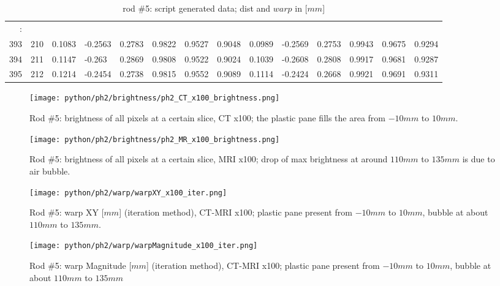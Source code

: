 \begin{table}[p]
{\begin{minipage}{\textheight}
\begin{tabular}{rr||lll|lll||lll|lll}
\hline
:      &      &         &         &        &        &        &        &         &         &        &        &        &        \\
393    & 210  & 0.1083  & -0.2563 & 0.2783 & 0.9822 & 0.9527 & 0.9048 & 0.0989  & -0.2569 & 0.2753 & 0.9943 & 0.9675 & 0.9294 \\
394    & 211  & 0.1147  & -0.263  & 0.2869 & 0.9808 & 0.9522 & 0.9024 & 0.1039  & -0.2608 & 0.2808 & 0.9917 & 0.9681 & 0.9287 \\
395    & 212  & 0.1214  & -0.2454 & 0.2738 & 0.9815 & 0.9552 & 0.9089 & 0.1114  & -0.2424 & 0.2668 & 0.9921 & 0.9691 & 0.9311
 \end{tabular}
        \caption{rod \#5: script generated data; dist and $warp$ in [$mm$]}
        \label{tab:spit-out-5}
      \end{minipage}
    }
  \end{table}

\begin{figure}[!tbh]
    \centering
    \texttt{[image: python/ph2/brightness/ph2\_CT\_x100\_brightness.png]}
    \caption{Rod \#5: brightness of all pixels at a certain slice, CT x100; the plastic pane fills the area from $-10mm$ to $10mm$.}
    \label{fig:ph2_CT_x100_brightness}
\end{figure}

\begin{figure}[!tbh]
    \centering
    \texttt{[image: python/ph2/brightness/ph2\_MR\_x100\_brightness.png]}
    \caption{Rod \#5: brightness of all pixels at a certain slice, MRI x100; drop of max brightness at around $110mm$ to $135mm$ is due to air bubble.}
    \label{fig:ph2_MR_x100_brightness}
\end{figure}


\begin{figure}[!bth]
  \centering
  \texttt{[image: python/ph2/warp/warpXY\_x100\_iter.png]}
  \caption{Rod \#5: warp XY [$mm$] (iteration method), CT-MRI x100; plastic pane present from $-10mm$ to $10mm$, bubble at about $110mm$ to $135mm$.}
  \label{fig:ph2_warpXY_x100}
\end{figure}

\begin{figure}[!tbh]
    \centering
    \texttt{[image: python/ph2/warp/warpMagnitude\_x100\_iter.png]}
    \caption{Rod \#5: warp Magnitude [$mm$] (iteration method), CT-MRI x100; plastic pane present from $-10mm$ to $10mm$, bubble at about $110mm$ to $135mm$}
    \label{fig:ph2_warpMagnitude_x100}
\end{figure}


